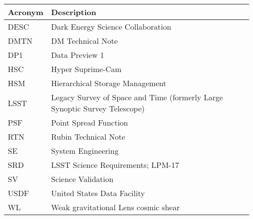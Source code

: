 \addtocounter{table}{-1}
\begin{longtable}{p{}p{}}\hline
\textbf{Acronym} & \textbf{Description}  \\\hline

DESC & Dark Energy Science Collaboration \\\hline
DMTN & DM Technical Note \\\hline
DP1 & Data Preview 1 \\\hline
HSC & Hyper Suprime-Cam \\\hline
HSM & Hierarchical Storage Management \\\hline
LSST & Legacy Survey of Space and Time (formerly Large Synoptic Survey Telescope) \\\hline
PSF & Point Spread Function \\\hline
RTN & Rubin Technical Note \\\hline
SE & System Engineering \\\hline
SRD & LSST Science Requirements; LPM-17 \\\hline
SV & Science Validation \\\hline
USDF & United States Data Facility \\\hline
WL & Weak gravitational Lens cosmic shear \\\hline
\end{longtable}
